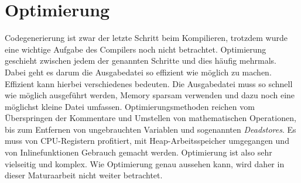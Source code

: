 \section{Optimierung}
Codegenerierung ist zwar der letzte Schritt beim Kompilieren, trotzdem wurde eine wichtige Aufgabe des Compilers noch nicht betrachtet. Optimierung geschieht zwischen jedem der genannten Schritte und dies häufig mehrmals.
Dabei geht es darum die Ausgabedatei so effizient wie möglich zu machen. Effizient kann hierbei verschiedenes bedeuten.
Die Ausgabedatei muss so schnell wie möglich ausgeführt werden, Memory sparsam verwenden und dazu noch eine möglichst kleine Datei umfassen. 
Optimierungsmethoden reichen vom Überspringen der Kommentare und Umstellen von mathematischen Operationen, bis zum Entfernen von ungebrauchten Variablen und sogenannten \textit{Deadstores}.
Es muss von CPU-Registern profitiert, mit Heap-Arbeitsspeicher umgegangen und von Inlinefunktionen Gebrauch gemacht werden. %
Optimierung ist also sehr vielseitig und komplex.
Wie Optimierung genau aussehen kann, wird daher in dieser Maturaarbeit nicht weiter betrachtet.
